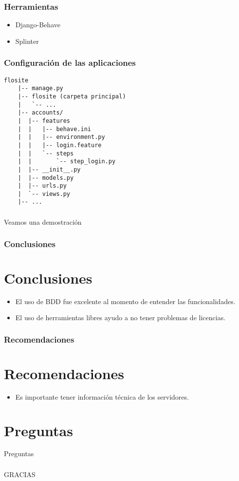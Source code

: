 \documentclass{beamer}
\begin{document}
\begin{frame}
  \frametitle{Herramientas}
  \begin{itemize}
      \item Django-Behave
      \item Splinter
  \end{itemize}
\end{frame}

\begin{frame}[fragile]
  \frametitle{Configuraci\'on de las aplicaciones}
  \begin{verbatim}
flosite
    |-- manage.py
    |-- flosite (carpeta principal)
    |   `-- ...
    |-- accounts/
    |  |-- features
    |  |   |-- behave.ini
    |  |   |-- environment.py
    |  |   |-- login.feature
    |  |   `-- steps
    |  |       `-- step_login.py
    |  |-- __init__.py
    |  |-- models.py
    |  |-- urls.py
    |  `-- views.py
    |-- ...

  \end{verbatim}
\end{frame}

\begin{frame}
  \frametitle{}
  \begin{center}
    Veamos una demostraci\'on
  \end{center}
\end{frame}

\begin{frame}
  \frametitle{Conclusiones}
  \section{Conclusiones}
  \begin{itemize}
      \item El uso de BDD fue excelente al momento de entender las funcionalidades.
      \item El uso de herramientas libres ayudo a no tener problemas de licencias.
  \end{itemize}
\end{frame}

\begin{frame}
  \frametitle{Recomendaciones}
  \section{Recomendaciones}
  \begin{itemize}
      \item Es importante tener informaci\'on t\'ecnica de los servidores.
  \end{itemize}
\end{frame}

\begin{frame}
  \frametitle{}
  \section{Preguntas}
  \begin{center}
    Preguntas
  \end{center}
\end{frame}

\begin{frame}
  \frametitle{}
  \begin{center}
    {\huge GRACIAS}
  \end{center}
\end{frame}
\end{document}
